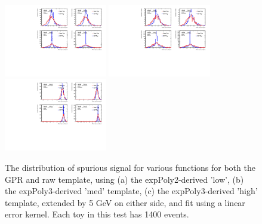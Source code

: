 \begin{figure} 
\begin{center}
  \includegraphics[width=0.4\textwidth]{figures/background/gpr/validation/linear/ToyTest_FitSigVals_lowpT_1400_noSig}   
  \includegraphics[width=0.4\textwidth]{figures/background/gpr/validation/linear/ToyTest_FitSigVals_medpT_1400_noSig}   
  \includegraphics[width=0.4\textwidth]{figures/background/gpr/validation/linear/ToyTest_FitSigVals_highpT_1400_noSig}   
\caption{The distribution of spurious signal for various functions for both the GPR and raw template, using (a) the expPoly2-derived 'low', (b) the expPoly3-derived 'med' template, (c) the expPoly3-derived 'high' template, extended by 5 GeV on either side, and fit using a linear error kernel. Each toy in this test has 1400 events.}
\label{fig:linearkernel_lowpt_1400_noSig}
\end{center}
\end{figure}

